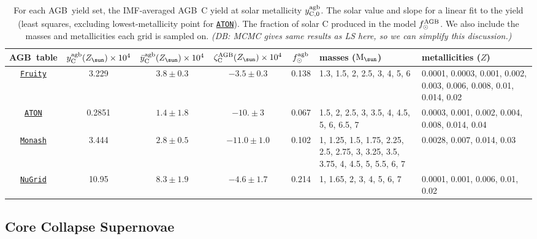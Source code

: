 \documentclass[fleqn,
usenatbib]{mnras}
\newcommand{\fruity}{\texttt{\hyperlink{fruity}{Fruity}}}
\newcommand{\nugrid}{\texttt{\hyperlink{nugrid}{NuGrid}}}
\newcommand{\monash}{\texttt{\hyperlink{monash}{Monash}}}
\newcommand{\aton}{\texttt{\hyperlink{aton}{ATON}}}
\newcommand{\agb}{AGB}
\newcommand{\zagb}{\zeta_{\rm C}^{\rm AGB}}
\newcommand{\Mo}{ {\rm M}_{\sun}}
\newcommand{\Zo}{ Z_{\sun}}
\newcommand{\dbnote}[1]{ {\color{Thistle} \textit{\small (DB: #1)}} }
\begin{document}
\begin{table}
	\centering
    \caption[]{For each \agb\ yield set, the IMF-averaged \agb\ C yield at solar metallicity $y_{\rm C, 0}^{\rm agb}$. The solar value and slope for a linear fit to the yield (least squares, excluding lowest-metallicity point for \aton). The fraction of solar C produced in the model $f_\odot^{\rm AGB}$.  We also include the masses and metallicities each grid is sampled on.
    \dbnote{MCMC gives same results as LS here, so we can simplify this discussion.}
    }

	\label{tab:agb}
    \begin{tabular}{c  ccc  c p{5cm} p{5cm}} %
		\hline 
        \agb\ table 
                & $y_{\rm C}^{\rm agb}(\Zo)\times10^4$ %
                & $\bar y_{\rm C}^{\rm agb}(\Zo)\times10^4$ %
                & $\zagb(\Zo)\times10^4$ %
                &  $f_\odot^{\rm agb}$
                & masses ($\Mo$) & metallicities ($Z$)\\
        \hline
        \fruity 
                & 3.229
                &  $3.8\pm0.3$
                & $-3.5\pm0.3$
                & 0.138
                & 1.3, 1.5, 2, 2.5, 3, 4, 5, 6
                & 0.0001, 0.0003, 0.001, 0.002, 0.003, 0.006, 0.008, 0.01, 0.014, 0.02
                \\
        \aton 
                & 0.2851
                & $1.4\pm1.8$
                & $-10. \pm 3$
                & 0.067
                & 1.5, 2, 2.5, 3, 3.5, 4, 4.5, 5, 6, 6.5, 7
                & 0.0003, 0.001, 0.002, 0.004, 0.008, 0.014, 0.04
                \\
        \monash 
                &  3.444
                & $2.8 \pm 0.5$
                & $-11.0\pm 1.0$
                & 0.102
                & 1, 1.25, 1.5, 1.75, 2.25, 2.5, 2.75, 3, 3.25, 3.5, 3.75, 4, 4.5, 5, 5.5, 6, 7 
                & 0.0028, 0.007, 0.014, 0.03
                \\
        \nugrid 
                & 10.95
                & $8.3\pm 1.9$
                & $-4.6\pm1.7$
                & 0.214
                & 1, 1.65, 2, 3, 4, 5, 6, 7
                &  0.0001, 0.001, 0.006, 0.01, 0.02
                \\
		\hline
	\end{tabular}
\end{table}




\subsection{Core Collapse Supernovae}
\end{document}
